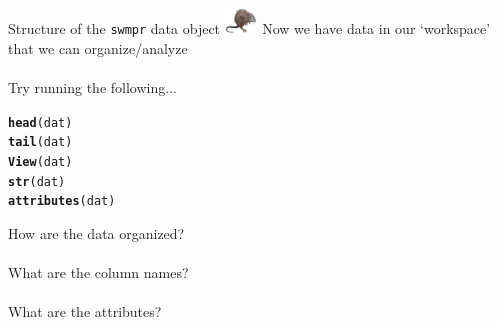 \documentclass[xcolor=dvipsnames]{beamer}\usepackage[]{graphicx}\usepackage[]{color}
\makeatletter
\newcommand{\hlstd}[1]{\textcolor[rgb]{0.345,0.345,0.345}{#1}}%
\newcommand{\hlkwd}[1]{\textcolor[rgb]{0.737,0.353,0.396}{\textbf{#1}}}%
\newenvironment{kframe}{%
 \def\at@end@of@kframe{}%
 \ifinner\ifhmode%
  \def\at@end@of@kframe{\end{minipage}}%
  \begin{minipage}{\columnwidth}%
 \fi\fi%
 \def\FrameCommand##1{\hskip\@totalleftmargin \hskip-\fboxsep
 \colorbox{shadecolor}{##1}\hskip-\fboxsep
     \hskip-\linewidth \hskip-\@totalleftmargin \hskip\columnwidth}%
 \MakeFramed {\advance\hsize-\width
   \@totalleftmargin\z@ \linewidth\hsize
   \@setminipage}}%
 {\par\unskip\endMakeFramed%
 \at@end@of@kframe}
\newenvironment{knitrout}{}{} %
\makeatother
\begin{document}
\begin{frame}[fragile]{Structure of the \texttt{swmpr} data object \includegraphics[width = 0.065\textwidth]{imgs/swmprat.png}}
\onslide<+->
Now we have data in our `workspace' that we can organize/analyze \\~\\
Try running the following...
\begin{knitrout}\scriptsize
{}\color{fgcolor}\begin{kframe}
\begin{alltt}
\hlkwd{head}\hlstd{(dat)}
\hlkwd{tail}\hlstd{(dat)}
\hlkwd{View}\hlstd{(dat)}
\hlkwd{str}\hlstd{(dat)}
\hlkwd{attributes}\hlstd{(dat)}
\end{alltt}
\end{kframe}
\end{knitrout}
\onslide<+->
How are the data organized?  \\~\\
What are the column names? \\~\\
What are the attributes?
\end{frame}
\end{document}
